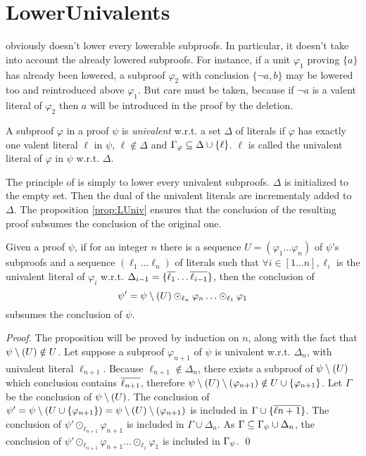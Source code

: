 \documentclass{llncs}
\begin{document}
\FloatBarrier
\section{LowerUnivalents} \label{sec:LUniv}

{\LowerUnits} obviously doesn't lower every lowerable subproofs. In particular, it doesn't take into
account the already lowered subproofs. For instance, if a unit $\varphi_1$ proving $\{a\}$ has
already been lowered, a subproof $\varphi_2$ with conclusion $\{\neg a,b\}$ may be lowered too and
reintroduced above $\varphi_1$. But care must be taken, because if $\neg a$ is a valent literal of
$\varphi_2$ then $a$ will be introduced in the proof by the deletion.

\begin{definition}
A subproof $\varphi$ in a proof $\psi$ is \emph{univalent} w.r.t. a set $\Delta$ of literals if
$\varphi$ has exactly one valent literal $\ell$ in $\psi$, $\ell \notin \Delta$ and
$\Gamma_{\varphi} \subseteq \Delta \cup \left\{ \ell \right\}$. $\ell$ is called the univalent
literal of $\varphi$ in $\psi$ w.r.t.  $\Delta$.
\end{definition}

The principle of {\LowerUnivalents} is simply to lower every univalent subproofs. $\Delta$ is
initialized to the empty set. Then the dual of the univalent literals are incrementaly added to
$\Delta$. The proposition \ref{prop:LUniv} ensures that the conclusion of the resulting proof
subsumes the conclusion of the original one.

\begin{proposition} \label{prop:LUniv}
Given a proof $\psi$, if for an integer $n$ there is a sequence $U = (\varphi_1 \ldots \varphi_n)$
of $\psi$'s subproofs and a sequence $(\ell_1 \ldots \ell_n)$ of literals such that $\forall i \in
[1 \ldots n], \ell_i$ is the univalent literal of $\varphi_i$ w.r.t. $\Delta_{i-1} = \{\overline{\ell_1}
\ldots \overline{\ell_{i-1}}\}$, then the conclusion of
$$ \psi' = \psi \setminus (U) \odot_{\ell_n} \varphi_n \ldots \odot_{\ell_1} \varphi_1 $$
subsumes the conclusion of $\psi$.
\end{proposition}

\begin{proof}
The proposition will be proved by induction on $n$, along with the fact that $\psi \setminus (U) \notin
U$. Let suppose a subproof $\varphi_{n+1}$ of $\psi$ is univalent w.r.t. $\Delta_n$, with univalent
literal $\ell_{n+1}$.  Because $\ell_{n+1} \notin \Delta_n$, there exists a subproof of
$\psi \setminus (U)$ which conclusion contains $\overline{\ell_{n+1}}$, therefore
$\psi \setminus (U) \setminus (\varphi_{n+1}) \notin U \cup \{\varphi_{n+1}\}$.  Let $\Gamma$ be the conclusion
of $\psi \setminus (U)$. The conclusion of $ \psi' = \psi \setminus (U \cup \{\varphi_{n+1}\}) =
\psi \setminus (U) \setminus (\varphi_{n+1}) $ is included in $\Gamma \cup \{\overline{\ell{n+1}}\}$. The conclusion
of $\psi' \odot_{\ell_{n+1}} \varphi_{n+1}$ is included in $\Gamma \cup \Delta_n$. As $\Gamma
\subseteq \Gamma_{\psi} \cup \Delta_n$, the conclusion of $\psi' \odot_{\ell_{n+1}}
\varphi_{n+1} \ldots \odot_{\ell_1} \varphi_1$ is included in $\Gamma_{\psi}$. \qed
\end{proof}
\end{document}
